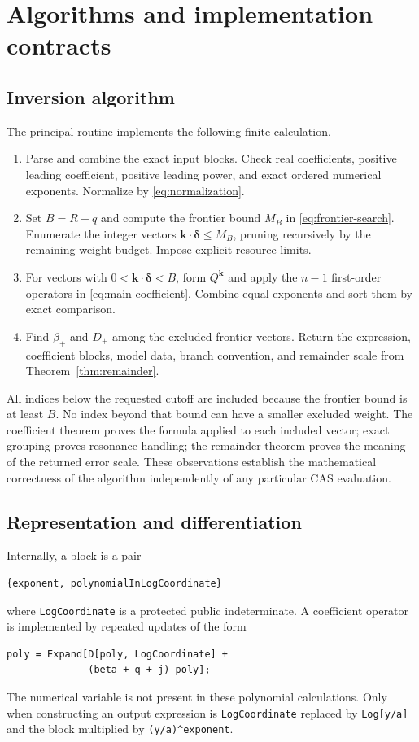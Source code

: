 \documentclass[11pt,a4paper]{article}
\numberwithin{equation}{section}
\theoremstyle{definition}
\newcommand{\kk}{\boldsymbol k}
\newcommand{\deltaa}{\boldsymbol\delta}
\newcommand{\code}[1]{\texttt{#1}}
\begin{document}
\section{Algorithms and implementation contracts}\label{sec:algorithms}

\subsection{Inversion algorithm}
The principal routine implements the following finite calculation.
\begin{enumerate}[label=\arabic*.]
\item Parse and combine the exact input blocks. Check real coefficients,
positive leading coefficient, positive leading power, and exact ordered
numerical exponents. Normalize by \eqref{eq:normalization}.
\item Set $B=R-q$ and compute the frontier bound $M_B$ in
\eqref{eq:frontier-search}. Enumerate the integer vectors
$\kk\cdot\deltaa\le M_B$, pruning recursively by the remaining weight
budget. Impose explicit resource limits.
\item For vectors with $0<\kk\cdot\deltaa<B$, form $Q^{\kk}$ and
apply the $n-1$ first-order operators in \eqref{eq:main-coefficient}.
Combine equal exponents and sort them by exact comparison.
\item Find $\beta_+$ and $D_+$ among the excluded frontier vectors.
Return the expression, coefficient blocks, model data, branch convention,
and remainder scale from Theorem~\ref{thm:remainder}.
\end{enumerate}
All indices below the requested cutoff are included because the frontier
bound is at least $B$. No index beyond that bound can have a smaller
excluded weight. The coefficient theorem proves the formula applied to
each included vector; exact grouping proves resonance handling; the
remainder theorem proves the meaning of the returned error scale.
These observations establish the mathematical correctness of the
algorithm independently of any particular CAS evaluation.

\subsection{Representation and differentiation}
Internally, a block is a pair
\begin{lstlisting}
{exponent, polynomialInLogCoordinate}
\end{lstlisting}
where \code{LogCoordinate} is a protected public indeterminate.
A coefficient operator is implemented by repeated updates of the form
\begin{lstlisting}
poly = Expand[D[poly, LogCoordinate] +
              (beta + q + j) poly];
\end{lstlisting}
The numerical variable is not present in these polynomial calculations.
Only when constructing an output expression is \code{LogCoordinate}
replaced by \code{Log[y/a]} and the block multiplied by
\lstinline|(y/a)^exponent|.
\end{document}
